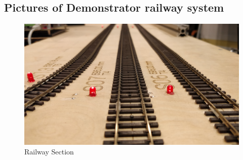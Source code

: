 \appendix
\chapter*{\fuggelek}
\setcounter{chapter}{\appendixnumber}

\section{Pictures of Demonstrator railway system} \label{appendix:HWPictures}
\begin{figure}[H]
	\centering
	\includegraphics[width=150mm, keepaspectratio]{figures/modes3/section.jpg}
	\caption{Railway Section}
	\label{fig:section}
\end{figure}
%
%
%
%
